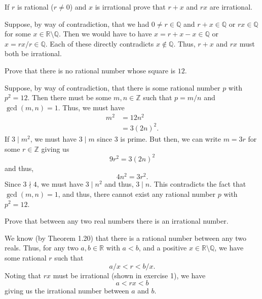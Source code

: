 \documentclass[12 pt, letterpaper]{hmcpset}
\begin{document}
\begin{problem}[1.]
	If $r$ is rational ($r \neq 0$) and $x$ is irrational prove that $r + x$ and $rx$ are irrational.
\end{problem}

\begin{solution}
	Suppose, by way of contradiction, that we had $0 \neq r \in \mathbb{Q}$ and $r + x \in \mathbb{Q}$ or $rx \in \mathbb{Q}$ for some $x \in \mathbb{R} \setminus \mathbb{Q}$. Then we would have to have $x = r + x - x \in \mathbb{Q}$ or $x = rx/r \in \mathbb{Q}$. Each of these directly contradicts $x \notin \mathbb{Q}$. Thus, $r + x$ and $rx$ must both be irrational.
\end{solution}

\pagebreak

\begin{problem}[2.]
	Prove that there is no rational number whose square is $12$.
\end{problem}

\begin{solution}
	Suppose, by way of contradiction, that there is some rational number $p$ with $p^{2} = 12$. Then there must be some $m, n \in \mathbb{Z}$ such that $p = m/n$ and $\gcd (m, n) = 1$. Thus, we must have
	\[
		\begin{split}
			m^{2} & = 12 n^2 \\
			      & = 3 (2n)^{2}.
		\end{split}
	\]
	If $3 \mid m^{2}$, we must have $3 \mid m$ since $3$ is prime. But then, we can write $m = 3r$ for some $r \in \mathbb{Z}$ giving us
	\[
		9 r^{2} = 3 (2n)^{2}
	\]
	and thus,
	\[
		4n^{2} = 3 r^{2}.
	\]
	Since $3 \nmid 4$, we must have $3 \mid n^{2}$ and thus, $3 \mid n$. This contradicts the fact that $\gcd(m, n) = 1$, and thus, there cannot exist any rational number $p$ with $p^{2} = 12$.
\end{solution}

\pagebreak

\begin{problem}[2*.]
	Prove that between any two real numbers there is an irrational number.
\end{problem}

\begin{solution}
	We know (by Theorem 1.20) that there is a rational number between any two reals. Thus, for any two $a, b \in \mathbb{R}$ with $a < b$, and a positive $x \in \mathbb{R} \setminus \mathbb{Q}$, we have some rational $r$ such that
	\[
		a/x < r < b/x.
	\]
	Noting that $rx$ must be irrational (shown in exercise 1), we have
	\[
		a < rx < b
	\]
	giving us the irrational number between $a$ and $b$.
\end{solution}
\end{document}
